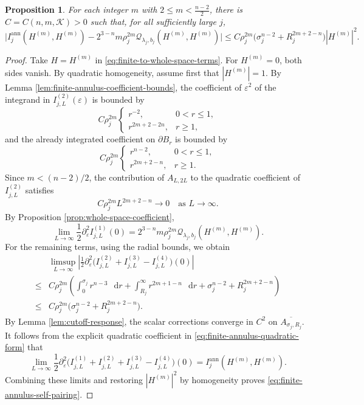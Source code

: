 \documentclass[11pt]{article}
\numberwithin{equation}{section}
\newtheorem{proposition}[theorem]{Proposition}
\theoremstyle{remark}
\newcommand{\eps}{\varepsilon}
\newcommand{\dd}{\mathop{}\!\mathrm{d}}
\begin{document}
\begin{proposition}\label{prop:finite-annulus-self-pairing}
For each integer \(m\) with \(2\le m<\frac{n-2}{2}\), there is
\(C=C(n,m,\mathcal K)>0\) such that, for all sufficiently large \(j\),
 {
\begin{equation}\label{eq:finite-annulus-self-pairing}
 \bigl|I_j^{\mathrm{ann}}(H^{(m)},H^{(m)})
 -2^{3-n}m\rho_j^{2m}
 \mathcal Q_{\lambda_j,b_j}(H^{(m)},H^{(m)})\bigr|
 \le C\rho_j^{2m}
 \bigl(\sigma_j^{n-2}+R_j^{2m+2-n}\bigr)
 |H^{(m)}|^2.
\end{equation}
}
\end{proposition}

\begin{proof}
Take \(H=H^{(m)}\) in \eqref{eq:finite-to-whole-space-terms}.
For \(H^{(m)}=0\), both sides vanish. By quadratic homogeneity,
assume first that \(|H^{(m)}|=1\). By Lemma
\ref{lem:finite-annulus-coefficient-bounds}, the coefficient of \(\eps^2\)
of the integrand in \(I_{j,L}^{(2)}(\eps)\) is bounded by
\[
 C\rho_j^{2m}
 \begin{cases}
  r^{-2},&0<r\le1,\\
  r^{2m+2-2n},&r\ge1,
 \end{cases}
\]
and the already integrated coefficient on \(\partial B_r\) is bounded by
\[
 C\rho_j^{2m}
 \begin{cases}
  r^{n-2},&0<r\le1,\\
  r^{2m+2-n},&r\ge1.
 \end{cases}
\]
{Since \(m<(n-2)/2\), the contribution of \(A_{L,2L}\) to the
quadratic coefficient of \(I_{j,L}^{(2)}\) satisfies}
\[
 C\rho_j^{2m}L^{2m+2-n}\to0
 \quad\text{as }L\to\infty.
\]
{By Proposition  \ref{prop:whole-space-coefficient},}
\[
 \lim_{L\to\infty}\frac12\partial_\eps^2 I_{j,L}^{(1)}(0)
 =2^{3-n}m\rho_j^{2m}
   \mathcal Q_{\lambda_j,b_j}(H^{(m)},H^{(m)}).
\]
{For the remaining terms, using the radial bounds, we obtain}
\[
 \begin{aligned}
 &\limsup_{L\to\infty}\left|\frac12\partial_\eps^2
  \bigl(I_{j,L}^{(2)}+I_{j,L}^{(3)}-I_{j,L}^{(4)}\bigr)(0)\right|\\
 {}\le{}&C\rho_j^{2m}\left(
 \int_0^{\sigma_j}r^{n-3}\,\dd r
 +\int_{R_j}^{\infty}r^{2m+1-n}\,\dd r
 +\sigma_j^{n-2}+R_j^{2m+2-n}\right)\\
 {}\le{}&C\rho_j^{2m}
 \bigl(\sigma_j^{n-2}+R_j^{2m+2-n}\bigr).
 \end{aligned}
\]
By Lemma  \ref{lem:cutoff-response}, the scalar corrections converge in
\(C^2\) on \(\overline{A_{\sigma_j,R_j}}\).
{It follows from the explicit quadratic coefficient in
\eqref{eq:finite-annulus-quadratic-form} that}
\[
 \lim_{L\to\infty}\frac12\partial_\eps^2
 \bigl(I_{j,L}^{(1)}+I_{j,L}^{(2)}+I_{j,L}^{(3)}-I_{j,L}^{(4)}\bigr)(0)
 =I_j^{\mathrm{ann}}(H^{(m)},H^{(m)}).
\]
Combining these limits and restoring \(|H^{(m)}|^2\) by homogeneity
proves \eqref{eq:finite-annulus-self-pairing}.
\end{proof}
\end{document}
